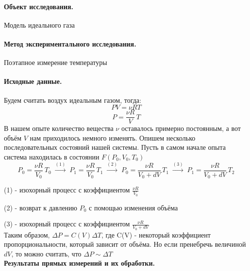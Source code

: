 \documentclass{article}
\begin{document}
\paragraph{Объект исследования.} Модель идеального газа
\paragraph{Метод экспериментального исследования.} Поэтапное измерение температуры
\paragraph{Исходные данные.}
Будем считать воздух идеальным газом, тогда:
$$PV=\nu RT $$
$$ P=\frac{\nu R}{V}\,T$$
В нашем опыте количество вещества $\nu$ оставалось примерно постоянным, а вот объём $V$ нам приходилось немного изменять. Опишем несколько последовательных состояний нашей системы.
Пусть в самом начале опыта система находилась в состоянии $F(P_0,V_0,T_0)$
$$ P_0=\frac{\nu R}{V_0}\,T_0\; \xrightarrow{(1)} \; P_1=\frac{\nu R}{V_0}\,T_1 \;\xrightarrow{(2)}\; P_0=\frac{\nu R}{V_0+dV}\,T_1 \;\xrightarrow{(3)} \; P_1=\frac{\nu R}{V_0+dV}\,T_2$$

(1) - изохорный процесс с коэффициентом $ \frac{\nu R}{V_0} $

(2) - возврат к давлению $P_0$ с помощью изменения объёма

(3) - изохорный процесс с коэффициентом $ \frac{\nu R}{V_0+dV} $\\

Таким образом, $\Delta P=C(V)\Delta T$, где C(V) - некоторый коэффициент пропорциональности, который зависит от объёма. Но если пренебречь величиной $dV$, то можно считать, что $\Delta P \sim \Delta T$\\

\textbf{Результаты прямых измерений и их обработки.}
\end{document}
